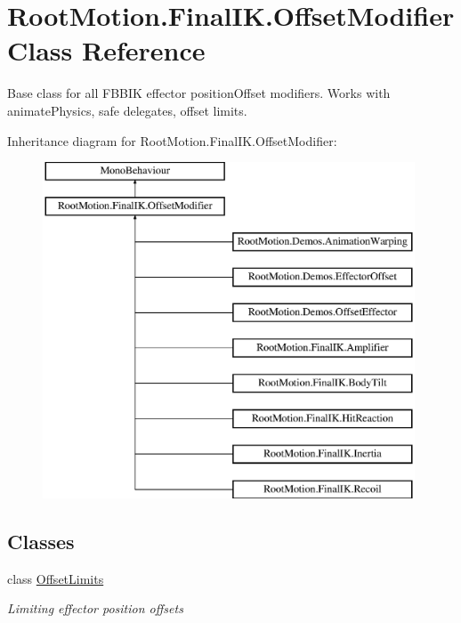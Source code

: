 \hypertarget{class_root_motion_1_1_final_i_k_1_1_offset_modifier}{}\section{Root\+Motion.\+Final\+I\+K.\+Offset\+Modifier Class Reference}
\label{class_root_motion_1_1_final_i_k_1_1_offset_modifier}


Base class for all F\+B\+B\+IK effector position\+Offset modifiers. Works with animate\+Physics, safe delegates, offset limits.  


Inheritance diagram for Root\+Motion.\+Final\+I\+K.\+Offset\+Modifier\+:\begin{figure}[H]
\begin{center}
\leavevmode
\includegraphics[height=10.000000cm]{class_root_motion_1_1_final_i_k_1_1_offset_modifier}
\end{center}
\end{figure}
\subsection*{Classes}
\begin{DoxyCompactItemize}
\item 
class \mbox{\hyperlink{class_root_motion_1_1_final_i_k_1_1_offset_modifier_1_1_offset_limits}{Offset\+Limits}}
\begin{DoxyCompactList}\small\item\em Limiting effector position offsets \end{DoxyCompactList}\end{DoxyCompactItemize}
